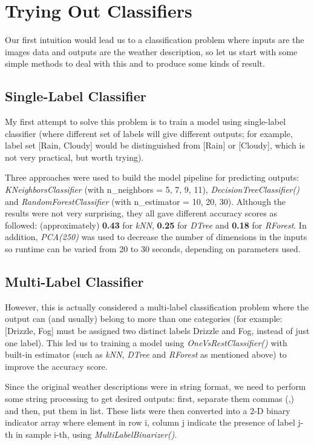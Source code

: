 \section{Trying Out Classifiers}

Our first intuition would lead us to a classification problem where inputs are the images data and outputs are the weather description, so let us start with some simple methods to deal with this and to produce some kinds of result. 

\subsection{Single-Label Classifier}

My first attempt to solve this problem is to train a model using single-label classifier (where different set of labels will give different outputs; for example, label set [Rain, Cloudy] would be distinguished from [Rain] or [Cloudy], which is not very practical, but worth trying).

Three approaches were used to build the model pipeline for predicting outputs: \textit{KNeighborsClassifier} (with n\_neighbors = 5, 7, 9, 11), \textit{DecisionTreeClassifier()} and \textit{RandomForestClassifier} (with n\_estimator = 10, 20, 30). Although the results were not very surprising, they all gave different accuracy scores as followed: (approximately) \textbf{0.43} for \textit{kNN}, \textbf{0.25} for \textit{DTree} and \textbf{0.18} for \textit{RForest}. In addition, \textit{PCA(250)} was used to decrease the number of dimensions in the inputs so runtime can be varied from 20 to 30 seconds, depending on parameters used. 

\subsection{Multi-Label Classifier}

However, this is actually considered a multi-label classification problem where the output can (and usually) belong to more than one categories (for example: [Drizzle, Fog] must be assigned two distinct labels Drizzle and Fog, instead of just one label). This led us to training a model using \textit{OneVsRestClassifier()} with built-in estimator (such as \textit{kNN}, \textit{DTree} and \textit{RForest} as mentioned above) to improve the accuracy score. 

Since the original weather descriptions were in string format, we need to perform some string processing to get desired outputs: first, separate them commas (,) and then, put them in list. These lists were then converted into a 2-D binary indicator array where element in row i, column j indicate the presence of label j-th in sample i-th, using \textit{MultiLabelBinarizer()}.

